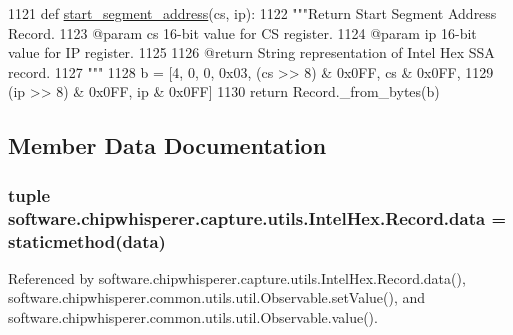 \begin{DoxyCode}
1121     \textcolor{keyword}{def }\hyperlink{classsoftware_1_1chipwhisperer_1_1capture_1_1utils_1_1IntelHex_1_1Record_aac32e40d4f3228b6b0889ad0f0fb1718}{start\_segment\_address}(cs, ip):
1122         \textcolor{stringliteral}{"""Return Start Segment Address Record.}
1123 \textcolor{stringliteral}{        @param  cs      16-bit value for CS register.}
1124 \textcolor{stringliteral}{        @param  ip      16-bit value for IP register.}
1125 \textcolor{stringliteral}{}
1126 \textcolor{stringliteral}{        @return         String representation of Intel Hex SSA record.}
1127 \textcolor{stringliteral}{        """}
1128         b = [4, 0, 0, 0x03, (cs >> 8) & 0x0FF, cs & 0x0FF,
1129              (ip >> 8) & 0x0FF, ip & 0x0FF]
1130         \textcolor{keywordflow}{return} Record.\_from\_bytes(b)
\end{DoxyCode}


\subsection{Member Data Documentation}
\hypertarget{classsoftware_1_1chipwhisperer_1_1capture_1_1utils_1_1IntelHex_1_1Record_aeef662fd4bb0403161279105c8a62198}{}
\subsubsection[{data}]{\setlength{\rightskip}{0pt plus 5cm}tuple software.\+chipwhisperer.\+capture.\+utils.\+Intel\+Hex.\+Record.\+data = staticmethod(data)\hspace{0.3cm}{\ttfamily [static]}}\label{classsoftware_1_1chipwhisperer_1_1capture_1_1utils_1_1IntelHex_1_1Record_aeef662fd4bb0403161279105c8a62198}


Referenced by software.\+chipwhisperer.\+capture.\+utils.\+Intel\+Hex.\+Record.\+data(), software.\+chipwhisperer.\+common.\+utils.\+util.\+Observable.\+set\+Value(), and software.\+chipwhisperer.\+common.\+utils.\+util.\+Observable.\+value().

\hypertarget{classsoftware_1_1chipwhisperer_1_1capture_1_1utils_1_1IntelHex_1_1Record_a477afb71966aed6301c61218c9f4dba1}{}
